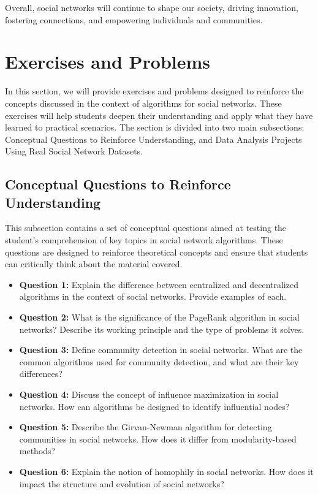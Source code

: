 \documentclass[12pt]{book} %
\begin{document}
Overall, social networks will continue to shape our society, driving innovation, fostering connections, and empowering individuals and communities.


\section{Exercises and Problems}
In this section, we will provide exercises and problems designed to reinforce the concepts discussed in the context of algorithms for social networks. These exercises will help students deepen their understanding and apply what they have learned to practical scenarios. The section is divided into two main subsections: Conceptual Questions to Reinforce Understanding, and Data Analysis Projects Using Real Social Network Datasets.

\subsection{Conceptual Questions to Reinforce Understanding}
This subsection contains a set of conceptual questions aimed at testing the student's comprehension of key topics in social network algorithms. These questions are designed to reinforce theoretical concepts and ensure that students can critically think about the material covered.

\begin{itemize}
    \item \textbf{Question 1:} Explain the difference between centralized and decentralized algorithms in the context of social networks. Provide examples of each.
    \item \textbf{Question 2:} What is the significance of the PageRank algorithm in social networks? Describe its working principle and the type of problems it solves.
    \item \textbf{Question 3:} Define community detection in social networks. What are the common algorithms used for community detection, and what are their key differences?
    \item \textbf{Question 4:} Discuss the concept of influence maximization in social networks. How can algorithms be designed to identify influential nodes?
    \item \textbf{Question 5:} Describe the Girvan-Newman algorithm for detecting communities in social networks. How does it differ from modularity-based methods?
    \item \textbf{Question 6:} Explain the notion of homophily in social networks. How does it impact the structure and evolution of social networks?
\end{itemize}
\end{document}
